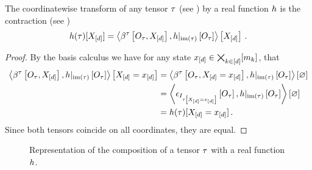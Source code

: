 \begin{theorem}
    \label{the:tensorFunctionComposition}
    The coordinatewise transform of any tensor $\tau$ (see ) by a real function $h$ is the contraction (see )
    \begin{align*}
        h(\tau)[X_{[d]}]
        = \left\langle \beta^{\tau}\left[O_{\tau},X_{[d]}\right],{h}|_{\mathrm{im}\left(\tau\right)}\left[O_{\tau}\right] \right\rangle \left[ X_{[d]} \right] \, .
    \end{align*}
\end{theorem}
\begin{proof}
    By the basis calculus  we have for any state $x_{[d]}\in\bigtimes_{k\in[d]}[m_{k}]$, that
    \begin{align*}
        \left\langle \beta^{\tau}\left[O_{\tau},X_{[d]}\right],{h}|_{\mathrm{im}\left(\tau\right)}\left[O_{\tau}\right]\right\rangle \left[ X_{[d]}=x_{[d]} \right]
        &= \left\langle \beta^{\tau}\left[O_{\tau},X_{[d]}=x_{[d]}\right],{h}|_{\mathrm{im}\left(\tau\right)}\left[O_{\tau}\right]\right\rangle \left[ \varnothing \right] \\
        & = \left\langle \epsilon_{I_{\tau\left[X_{[d]}=x_{[d]}\right]}}\left[O_{\tau}\right],{h}|_{\mathrm{im}\left(\tau\right)}\left[O_{\tau}\right]\right\rangle \left[ \varnothing \right] \\
        & = h(\tau)[X_{[d]}=x_{[d]}] \, .
    \end{align*}
    Since both tensors coincide on all coordinates, they are equal.
\end{proof}

\begin{figure}[t]
    \begin{center}
        
    \end{center}
    \caption{Representation of the composition of a tensor $\tau$ with a real function $h$.}
    \label{fig:tensorFunctionComposition}
\end{figure}


